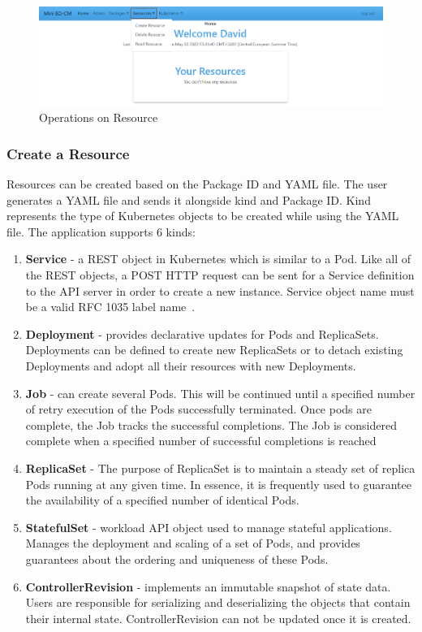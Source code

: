 \begin{figure}[H]
	\centering
	\includegraphics[width=\textwidth]{images/resource-operation.png}
	\caption{Operations on Resource}
	\label{ssec:operations-on-resource}
\end{figure}

\subsubsection{Create a Resource}
Resources can be created based on the Package ID and YAML file. The user generates a YAML file and sends it alongside kind and Package ID. Kind represents the type of Kubernetes objects to be created while using the YAML file. The application supports 6 kinds:
\begin{enumerate}
    \item \textbf{Service} - a REST object in Kubernetes which is similar to a Pod. Like all of the REST objects, a POST HTTP request can be sent for a Service definition to the API server in order to create a new instance. Service object name must be a valid RFC 1035 label name~\cite{rfc-1035}.
    \item \textbf{Deployment} - provides declarative updates for Pods and ReplicaSets. Deployments can be defined to create new ReplicaSets or to detach existing Deployments and adopt all their resources with new Deployments.
    \item \textbf{Job} - can create several Pods. This will be continued until a specified number of retry execution of the Pods successfully terminated. Once pods are complete, the Job tracks the successful completions. The Job is considered complete when a specified number of successful completions is reached
    \item \textbf{ReplicaSet} - The purpose of ReplicaSet is to maintain a steady set of replica Pods running at any given time. In essence, it is frequently used to guarantee the availability of a specified number of identical Pods.
    \item \textbf{StatefulSet} - workload API object used to manage stateful applications.
    Manages the deployment and scaling of a set of Pods, and provides guarantees about the ordering and uniqueness of these Pods.
    \item \textbf{ControllerRevision} - implements an immutable snapshot of state data. Users are responsible for serializing and deserializing the objects that contain their internal state. ControllerRevision can not be updated once it is created.
\end{enumerate}

